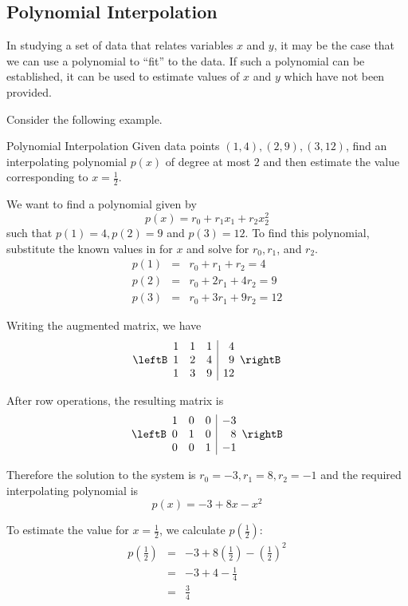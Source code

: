 \subsection{Polynomial Interpolation}

In studying a set of data that relates variables $x$ and $y$, it may be the case that we can use a polynomial to ``fit'' to the data. If such a polynomial can be established, it can be used to estimate values of $x$ and $y$ which have not been provided. 

Consider the following example.

\begin{example}{Polynomial Interpolation}\label{exa:polynomialinterpolation}
Given data points $(1,4), (2,9), (3,12)$, find an interpolating polynomial $p(x)$ of degree at most $2$ and then estimate the value corresponding to $x = \frac{1}{2}$. 
\end{example}

\begin{solution}
We want to find a polynomial given by 
\[
p(x) = r_0 + r_1x_1 + r_2x_2^2
\]
such that $p(1)=4, p(2)=9$ and $p(3)=12$. 
To find this polynomial, substitute the known values in for $x$ and solve for $r_0, r_1$, and $r_2$. 
\begin{eqnarray*}
p(1) &=& r_0 + r_1 + r_2 = 4\\
p(2) &=& r_0 + 2r_1 + 4r_2 = 9\\
p(3) &=& r_0 + 3r_1 + 9r_2 = 12
\end{eqnarray*}

Writing the augmented matrix, we have
\[
\leftB
\begin{array}{rrr|r}
1 & 1 & 1 & 4 \\
1 & 2 & 4 & 9  \\
1 & 3 & 9 & 12 
\end{array}
\rightB
\]

After row operations, the resulting matrix is
\[
\leftB
\begin{array}{rrr|r}
1 & 0 & 0 & -3 \\
0 & 1 & 0 & 8 \\
0 & 0 & 1 & -1 
\end{array}
\rightB
\]

Therefore the solution to the system is $r_0 = -3, r_1 = 8, r_2 = -1$ and the required interpolating polynomial is 
\[
p(x) = -3 + 8x - x^2
\]

To estimate the value for $x = \frac{1}{2}$, we calculate $p(\frac{1}{2})$: 
\begin{eqnarray*}
p(\frac{1}{2}) &=& -3 + 8(\frac{1}{2}) - (\frac{1}{2})^2\\
&=& -3 + 4 - \frac{1}{4} \\
&=& \frac{3}{4}
\end{eqnarray*}
\end{solution}

